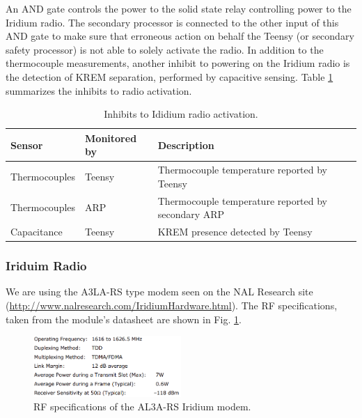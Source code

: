 \documentclass{article}
\begin{document}
An AND gate controls the power to the solid state relay controlling power to the Iridium radio. The secondary processor is connected to the other input of this AND gate to make sure that erroneous action on behalf the Teensy (or secondary safety processor) is not able to solely activate the radio. In addition to the thermocouple measurements, another inhibit to powering on the Iridium radio is the detection of KREM separation, performed by capacitive sensing. Table \ref{tab:radio-inhibits} summarizes the inhibits to radio activation.


\begin{table}[H]
	\caption{Inhibits to Ididium radio activation.}
	\label{tab:radio-inhibits}
	\centering
	\begin{tabular}{l|l|l}
		Sensor & Monitored by     &  Description  \\
		\hline
		
		Thermocouples & Teensy  & Thermocouple temperature reported by Teensy\\
		Thermocouples & ARP		& Thermocouple temperature reported by secondary ARP \\
		Capacitance	  & Teensy  & KREM presence detected by Teensy
	\end{tabular}
	
\end{table}



\subsubsection{Iriduim Radio}
We are using the A3LA-RS type modem seen on the NAL Research site (\url{http://www.nalresearch.com/IridiumHardware.html}). The RF specifications, taken from the module's datasheet are shown in Fig. \ref{fig:iridium-rf-specs}.

\begin{figure}[H]
    \centering
    \includegraphics[width=0.5\textwidth]{images/iridium-rf-specs.png}
    \caption{RF specifications of the AL3A-RS Iridium modem.}
    \label{fig:iridium-rf-specs}
\end{figure}
\end{document}
